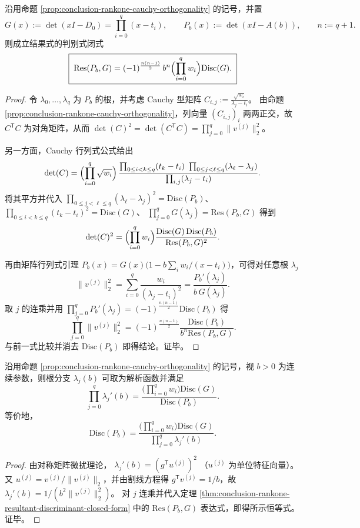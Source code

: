 \begin{theorem}\label{thm:conclusion-rankone-resultant-discriminant-closed-form}
沿用命题 \ref{prop:conclusion-rankone-cauchy-orthogonality} 的记号，并置
\[
G(x):=\det(xI-D_0)=\prod_{i=0}^{q}(x-t_i),\qquad
P_b(x):=\det(xI-A(b)),
\qquad n:=q+1.
\]
则成立结果式的判别式闭式
\[
\boxed{\;
\mathrm{Res}(P_b,G)=(-1)^{\frac{n(n-1)}2}\,b^{n}\Bigl(\prod_{i=0}^{q}w_i\Bigr)\mathrm{Disc}(G).\;}
\]
\end{theorem}
\begin{proof}
令 \(\lambda_0,\dots,\lambda_q\) 为 \(P_b\) 的根，并考虑 Cauchy 型矩阵
\(
C_{i,j}:=\frac{\sqrt{w_i}}{\lambda_j-t_i}
\)。
由命题 \ref{prop:conclusion-rankone-cauchy-orthogonality}，列向量 \((C_{i,j})_{i}\) 两两正交，故 \(C^{\mathsf T}C\) 为对角矩阵，从而
\(
\det(C)^2=\det(C^{\mathsf T}C)=\prod_{j=0}^{q}\|v^{(j)}\|_2^2
\)。
\par
另一方面，Cauchy 行列式公式给出
\[
\det(C)=\Bigl(\prod_{i=0}^{q}\sqrt{w_i}\Bigr)\,
\frac{\prod_{0\le i<k\le q}(t_k-t_i)\ \prod_{0\le j<\ell\le q}(\lambda_\ell-\lambda_j)}
{\prod_{i,j}(\lambda_j-t_i)}.
\]
将其平方并代入
\(
\prod_{0\le j<\ell\le q}(\lambda_\ell-\lambda_j)^2=\mathrm{Disc}(P_b)
\)、
\(
\prod_{0\le i<k\le q}(t_k-t_i)^2=\mathrm{Disc}(G)
\)、
\(
\prod_{j=0}^{q}G(\lambda_j)=\mathrm{Res}(P_b,G)
\)
得到
\[
\det(C)^2=\Bigl(\prod_{i=0}^{q}w_i\Bigr)\frac{\mathrm{Disc}(G)\,\mathrm{Disc}(P_b)}{\mathrm{Res}(P_b,G)^2}.
\]
\par
再由矩阵行列式引理 \(P_b(x)=G(x)\bigl(1-b\sum_i w_i/(x-t_i)\bigr)\)，可得对任意根 \(\lambda_j\)
\[
\|v^{(j)}\|_2^2=\sum_{i=0}^{q}\frac{w_i}{(\lambda_j-t_i)^2}=\frac{P_b'(\lambda_j)}{b\,G(\lambda_j)}.
\]
取 \(j\) 的连乘并用
\(
\prod_{j=0}^{q}P_b'(\lambda_j)=(-1)^{\frac{n(n-1)}2}\mathrm{Disc}(P_b)
\)
得
\[
\prod_{j=0}^{q}\|v^{(j)}\|_2^2
=(-1)^{\frac{n(n-1)}2}\frac{\mathrm{Disc}(P_b)}{b^{n}\mathrm{Res}(P_b,G)}.
\]
与前一式比较并消去 \(\mathrm{Disc}(P_b)\) 即得结论。证毕。
\end{proof}

\begin{corollary}\label{cor:conclusion-rankone-eigenvalue-speed-discriminant-identity}
沿用命题 \ref{prop:conclusion-rankone-cauchy-orthogonality} 的记号，视 \(b>0\) 为连续参数，则根分支 \(\lambda_j(b)\) 可取为解析函数并满足
\[
\prod_{j=0}^{q}\lambda_j'(b)=\frac{\bigl(\prod_{i=0}^{q}w_i\bigr)\mathrm{Disc}(G)}{\mathrm{Disc}(P_b)}.
\]
等价地，
\[
\mathrm{Disc}(P_b)=\frac{\bigl(\prod_{i=0}^{q}w_i\bigr)\mathrm{Disc}(G)}{\prod_{j=0}^{q}\lambda_j'(b)}.
\]
\end{corollary}
\begin{proof}
由对称矩阵微扰理论，
\(
\lambda_j'(b)=(g^{\mathsf T}u^{(j)})^2
\)
（\(u^{(j)}\) 为单位特征向量）。
又 \(u^{(j)}=v^{(j)}/\|v^{(j)}\|_2\)，并由割线方程得 \(g^{\mathsf T}v^{(j)}=1/b\)，故
\(
\lambda_j'(b)=1/(b^2\|v^{(j)}\|_2^2)
\)。
对 \(j\) 连乘并代入定理 \ref{thm:conclusion-rankone-resultant-discriminant-closed-form} 中的 \(\mathrm{Res}(P_b,G)\) 表达式，即得所示恒等式。证毕。
\end{proof}

